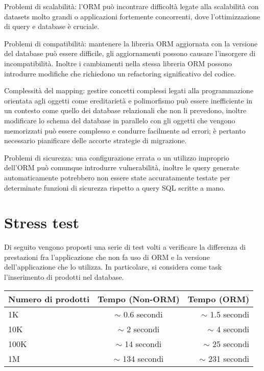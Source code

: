 Problemi di scalabilità: l'ORM può incontrare difficoltà legate alla scalabilità con datasets molto grandi o applicazioni fortemente concorrenti, dove l'ottimizzazione di query e database è cruciale.

Problemi di compatibilità: mantenere la libreria ORM aggiornata con la versione del database può essere difficile, gli aggiornamenti possono causare l'insorgere di incompatibilità. Inoltre i cambiamenti nella stessa libreria ORM possono introdurre modifiche che richiedono un refactoring significativo del codice.

Complessità del mapping: gestire concetti complessi legati alla programmazione orientata agli oggetti come ereditarietà e polimorfismo può essere inefficiente in un contesto come quello dei database relazionali che non li prevedono, inoltre modificare lo schema del database in parallelo con gli oggetti che vengono memorizzati può essere complesso e condurre facilmente ad errori; è pertanto necessario pianificare delle accorte strategie di migrazione.

Problemi di sicurezza: una configurazione errata o un utilizzo improprio dell'ORM può comunque introdurre vulnerabilità, inoltre le query generate automaticamente potrebbero non essere state accuratamente testate per determinate funzioni di sicurezza rispetto a query SQL scritte a mano.

\section{Stress test}

Di seguito vengono proposti una serie di test volti a verificare la differenza di prestazioni fra l'applicazione che non fa uso di ORM e la versione dell'applicazione che lo utilizza. In particolare, si considera come task l'inserimento di prodotti nel database.

\begin{table}[h!]
  \begin{center}
    \begin{tabular}{l|c|r} %
      \textbf{Numero di prodotti} & \textbf{Tempo (Non-ORM)} & \textbf{Tempo (ORM)}\\
      \hline
      1K & $\sim$ 0.6 secondi & $\sim$ 1.5 secondi\\
      10K & $\sim$ 2 secondi & $\sim$ 4 secondi\\
      100K & $\sim$ 14 secondi & $\sim$ 25 secondi\\
      1M & $\sim$ 134 secondi & $\sim$ 231 secondi\\
    \end{tabular}
  \end{center}
\end{table}

